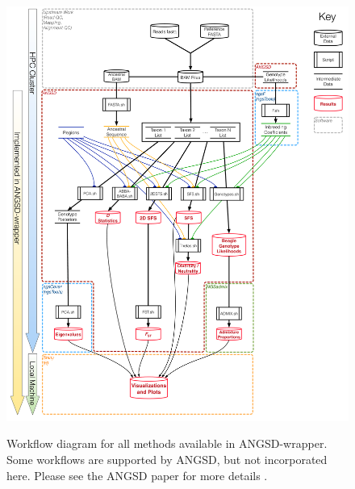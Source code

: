 \renewcommand{\thefigure}{S\arabic{figure}}
\renewcommand{\thetable}{S\arabic{table}}
\setcounter{figure}{0}
\setcounter{table}{0}

\begin{figure}
\centering
\caption{Workflow diagram for all methods available in ANGSD-wrapper. Some workflows are supported by ANGSD, but not incorporated here. Please see the ANGSD paper for more details \citep{korneliussen2014angsd}.}
\includegraphics[width=\linewidth]{figures/Wiki_Workflow_Rev2.pdf}
\label{fig:supp2}
\end{figure}

